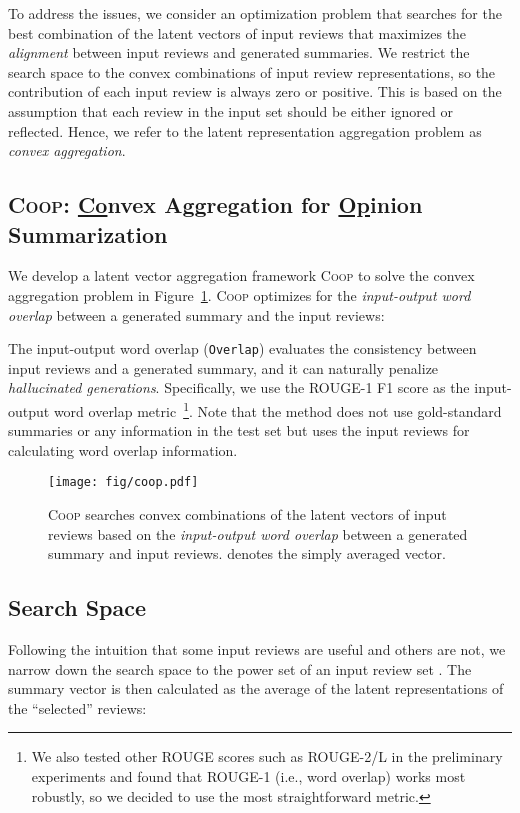 \documentclass[11pt]{article}
\newcommand{\aggname}{\textsc{Coop}}
\newcommand{\hl}[1]{#1}
\begin{document}
To address the issues, we consider an optimization problem that searches for the best combination of the latent vectors of input reviews that maximizes the {\em alignment} between input reviews and generated summaries.
We restrict the search space to the convex combinations of input review representations, so the contribution of each input review is always zero or positive. This is based on the assumption that each review in the input set should be either ignored or reflected. Hence, we refer to the latent representation aggregation problem as {\em convex aggregation}.

\subsection{\aggname{}: \underline{Co}nvex Aggregation for \underline{Op}inion Summarization}
We develop a latent vector aggregation framework \aggname{} to solve the convex aggregation problem \hl{in Figure~\ref{fig:coop}}. \aggname{} optimizes for the {\em input-output word overlap} between a generated summary and the input reviews:
{
\setlength{\abovedisplayskip}{2mm}
\setlength{\belowdisplayskip}{2mm}
\setlength{\abovedisplayshortskip}{0pt}
\setlength{\belowdisplayshortskip}{0pt}

}

The input-output word overlap ({\tt Overlap}) evaluates the consistency between input reviews and a generated summary, and it can naturally penalize {\em hallucinated generations}. Specifically, we use the ROUGE-1 F1 score as the input-output word overlap metric~\cite{lin-2004-rouge}\footnote{We also tested other ROUGE scores such as ROUGE-2/L in the preliminary experiments and found that ROUGE-1 (i.e., word overlap) works most robustly, so we decided to use the most straightforward metric.}.
Note that the method does not use gold-standard summaries or any information in the test set but uses the input reviews for calculating word overlap information.

\begin{figure}[t]
    \centering
    \texttt{[image: fig/coop.pdf]}
    \caption{\aggname{} \hl{searches} convex combinations of the latent \hl{vectors} of input reviews based on the {\em input-output word overlap} between a generated summary and input reviews.  denotes the simply averaged vector.}
    \label{fig:coop}
\end{figure}

\subsection{Search Space}
\label{sub:powerset}
Following the intuition that some input reviews are useful and others are not, we narrow down the search space to the power set of an input review set . The summary vector is then calculated as the average of the latent representations of the ``selected'' reviews:
\end{document}
